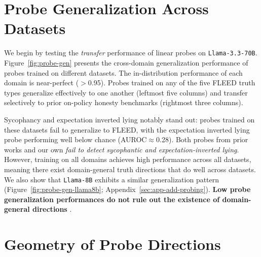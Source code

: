 \documentclass{article}
\theoremstyle{plain}
\theoremstyle{definition}
\theoremstyle{remark}
\begin{document}
\section{Probe Generalization Across Datasets}
\label{sec:probe-gen}

We begin by testing the \emph{transfer} performance of linear probes on \texttt{Llama-3.3-70B}. Figure~\ref{fig:probe-gen} presents the cross-domain generalization performance of probes trained on different datasets. The in-distribution performance of each domain is near-perfect ($>$0.95). Probes trained on any of the five FLEED truth types generalize effectively to one another (leftmost five columns) and transfer selectively to prior on-policy honesty benchmarks (rightmost three columns). 

Sycophancy and expectation inverted lying notably stand out: probes trained on these datasets fail to generalize to FLEED, with the expectation inverted lying probe performing well below chance (AUROC$\approx$0.28). Both probes from prior works and our own \textit{fail to detect sycophantic and expectation-inverted lying}. However, training on all domains achieves high performance across all datasets, meaning there exist domain-general truth directions that do well across datasets. We also show that \texttt{Llama-8B} exhibits a similar generalization pattern (Figure~\ref{fig:probe-gen-llama8b}; Appendix~\ref{sec:app-add-probing}). \textbf{Low probe generalization performances do not rule out the existence of domain-general directions} \cite{burger2024truth}. 


\section{Geometry of Probe Directions} 
\end{document}
